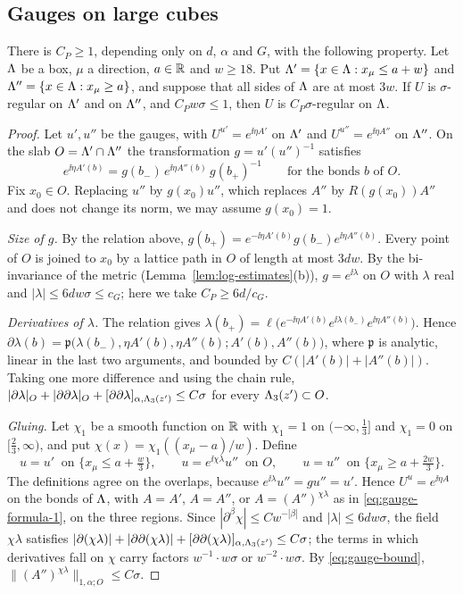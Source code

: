 \subsection{Gauges on large cubes}

\begin{lemma}[Patching]\label{lem:patching}
There is $C_P\ge1$, depending only on $d$, $\alpha$ and $G$, with the following property. Let $\Lambda$ be a box, $\mu$ a direction, $a\in\mathbb R$ and $w\ge18$. Put $\Lambda'=\{x\in\Lambda:x_\mu\le a+w\}$ and $\Lambda''=\{x\in\Lambda:x_\mu\ge a\}$, and suppose that all sides of $\Lambda$ are at most $3w$. If $U$ is $\sigma$-regular on $\Lambda'$ and on $\Lambda''$, and $C_Pw\sigma\le1$, then $U$ is $C_P\sigma$-regular on $\Lambda$.
\end{lemma}

\begin{proof}
Let $u',u''$ be the gauges, with $U^{u'}=e^{\ii\eta A'}$ on $\Lambda'$ and $U^{u''}=e^{\ii\eta A''}$ on $\Lambda''$. On the slab $O=\Lambda'\cap\Lambda''$ the transformation $g=u'(u'')^{-1}$ satisfies
\[
e^{\ii\eta A'(b)}=g(b_-)\,e^{\ii\eta A''(b)}\,g(b_+)^{-1}\qquad\text{for the bonds }b\text{ of }O .
\]
Fix $x_0\in O$. Replacing $u''$ by $g(x_0)u''$, which replaces $A''$ by $R(g(x_0))A''$ and does not change its norm, we may assume $g(x_0)=1$.

\emph{Size of $g$.} By the relation above, $g(b_+)=e^{-\ii\eta A'(b)}g(b_-)e^{\ii\eta A''(b)}$. Every point of $O$ is joined to $x_0$ by a lattice path in $O$ of length at most $3dw$. By the bi-invariance of the metric (Lemma~\ref{lem:log-estimates}(b)), $g=e^{\ii\lambda}$ on $O$ with $\lambda$ real and $|\lambda|\le6dw\sigma\le c_G$; here we take $C_P\ge6d/c_G$.

\emph{Derivatives of $\lambda$.} The relation gives $\lambda(b_+)=\ell\big(e^{-\ii\eta A'(b)}e^{\ii\lambda(b_-)}e^{\ii\eta A''(b)}\big)$. Hence $\partial\lambda(b)=\mathfrak p\big(\lambda(b_-),\eta A'(b),\eta A''(b);A'(b),A''(b)\big)$, where $\mathfrak p$ is analytic, linear in the last two arguments, and bounded by $C(|A'(b)|+|A''(b)|)$. Taking one more difference and using the chain rule, $|\partial\lambda|_O+|\partial\partial\lambda|_O+[\partial\partial\lambda]_{\alpha,\Lambda_3(z')}\le C\sigma$ for every $\Lambda_3(z')\subset O$.

\emph{Gluing.} Let $\chi_1$ be a smooth function on $\mathbb R$ with $\chi_1=1$ on $(-\infty,\frac13]$ and $\chi_1=0$ on $[\frac23,\infty)$, and put $\chi(x)=\chi_1((x_\mu-a)/w)$. Define
\[
u=u'\ \text{ on }\{x_\mu\le a+\tfrac w3\},\qquad u=e^{\ii\chi\lambda}u''\ \text{ on }O,\qquad u=u''\ \text{ on }\{x_\mu\ge a+\tfrac{2w}3\}.
\]
The definitions agree on the overlaps, because $e^{\ii\lambda}u''=gu''=u'$. Hence $U^u=e^{\ii\eta A}$ on the bonds of $\Lambda$, with $A=A'$, $A=A''$, or $A=(A'')^{\chi\lambda}$ as in \eqref{eq:gauge-formula-1}, on the three regions. Since $|\partial^\beta\chi|\le Cw^{-|\beta|}$ and $|\lambda|\le6dw\sigma$, the field $\chi\lambda$ satisfies $|\partial(\chi\lambda)|+|\partial\partial(\chi\lambda)|+[\partial\partial(\chi\lambda)]_{\alpha,\Lambda_3(z')}\le C\sigma$; the terms in which derivatives fall on $\chi$ carry factors $w^{-1}\cdot w\sigma$ or $w^{-2}\cdot w\sigma$. By \eqref{eq:gauge-bound}, $\|(A'')^{\chi\lambda}\|_{1,\alpha;O}\le C\sigma$.


\end{proof}
